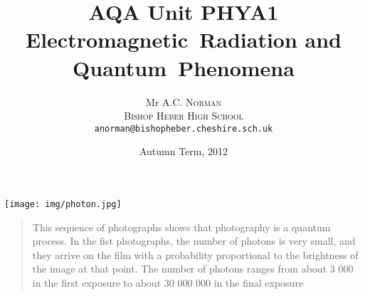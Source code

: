 \documentclass[a4paper,12pt]{article}
\title{AQA Unit PHYA1\\Electromagnetic~Radiation and Quantum~Phenomena}
\author{Mr \textsc{A.C. Norman}\\
\textsc{Bishop Heber High School}
\\ \texttt{anorman@bishopheber.cheshire.sch.uk}}
\date{Autumn Term, 2012}
\begin{document}
\begin{titlepage}
\maketitle

\thispagestyle{empty}
\enlargethispage{4cm}
	
\noindent\texttt{[image: img/photon.jpg]}

\footnotesize
\begin{quotation}
This sequence of photographs shows that photography is a quantum process. In the fist photographs, the number of photons is very small, and they arrive on the film with a probability proportional to the brightness of the image at that point. The number of photons ranges from about 3 000 in the first exposure to about 30 000 000 in the final exposure 
\end{quotation}
\begin{flushright}
\end{flushright}

\normalsize

\end{titlepage}
\newpage

\thispagestyle{empty}
\addtocounter{page}{-1}

\begin{center}
\end{center}

\clearpage







\end{document}
